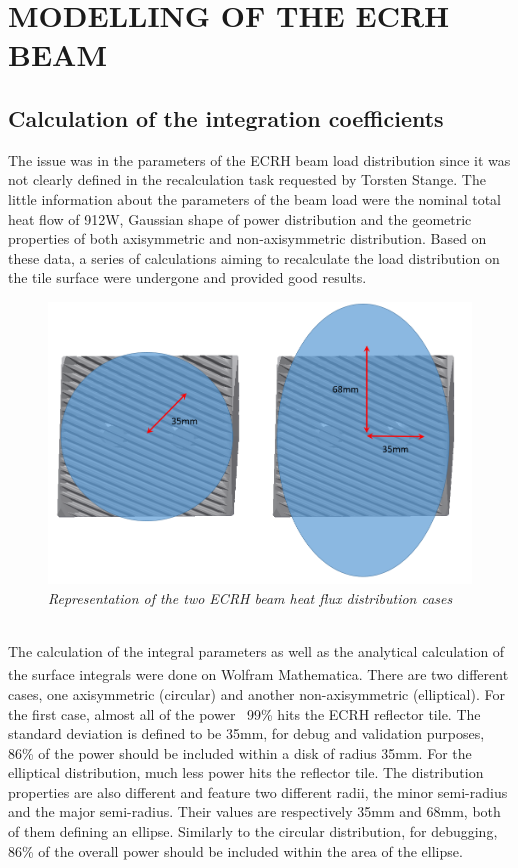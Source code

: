 \section{MODELLING OF THE ECRH BEAM}
\subsection{Calculation of the integration coefficients}
\normalsize{The issue was in the parameters of the \acrshort{ECRH} beam load distribution since it was not clearly defined in the recalculation task requested by Torsten Stange. The little information about the parameters of the beam load were the nominal total heat flow of 912W, Gaussian shape of power distribution and the geometric properties of both axisymmetric and non-axisymmetric distribution. Based on these data, a series of calculations aiming to recalculate the load distribution on the tile surface  were undergone and provided good results.}
\begin{figure}[h!]
    \label{fig_4_1} 
    \centering
    \includegraphics[width=.9\textwidth]{figures/TWOBEAMDISTRI.png}
    \caption{\it Representation of the two ECRH beam heat flux distribution cases}
\end{figure}
\\
\normalsize{\indent The calculation of the integral parameters as well as the analytical calculation of the surface integrals were done on Wolfram Mathematica\textsuperscript{\textregistered}. There are two different cases, one axisymmetric (circular) and another non-axisymmetric (elliptical). For the first case, almost all of the power ~99\% hits the ECRH reflector tile. The standard deviation is defined to be 35mm, for debug and validation purposes, 86\% of the power should be included within a disk of radius 35mm. For the elliptical distribution, much less power hits the reflector tile. The distribution properties are also different and feature two different radii, the minor semi-radius and the major semi-radius. Their values are respectively 35mm and 68mm, both of them defining an ellipse. Similarly to the circular distribution, for debugging, 86\% of the overall power should be included within the area of the ellipse.}
